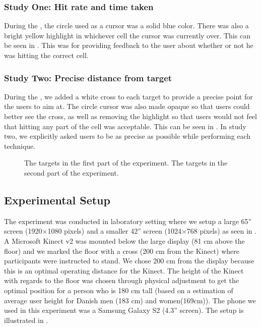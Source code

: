 \subsubsection{Study One: Hit rate and time taken} 
During the \target, the circle used as a cursor was a solid blue color. 
There was also a bright yellow highlight in whichever cell the cursor was currently over.
This can be seen in .
This was for providing feedback to the user about whether or not he was hitting the correct cell. 

\subsubsection{Study Two: Precise distance from target}
During the \accuracy, we added a white cross to each target to provide a precise point for the users to aim at.
The circle cursor was also made opaque so that users could better see the cross, as well as removing the highlight so that users would not feel that hitting any part of the cell was acceptable.
This can be seen in .
In study two, we explicitly asked users to be as precise as possible while performing each technique.

\begin{figure}[H]
\centering
{}
\hspace{0.05\columnwidth}
\caption{\protect{} The targets in the first part of the experiment. \protect{} The targets in the second part of the experiment.}
\end{figure}

\subsection{Experimental Setup} \label{sec:setup}
The experiment was conducted in laboratory setting where we setup a large 65'' screen (1920$\times$1080 pixels) and a smaller 42'' screen (1024$\times$768 pixels) as seen in .
A Microsoft Kinect v2 was mounted below the large display (81 cm above the floor) and we marked the floor with a cross (200 cm from the Kinect) where participants were instructed to stand.
We chose 200 cm from the display because this is an optimal operating distance for the Kinect.
The height of the Kinect with regards to the floor was chosen through physical adjustment to get the optimal position for a person who is 180 cm tall (based on a estimation of average user height for Danish men (183 cm) and women(169cm)).
The phone we used in this experiment was a Samsung Galaxy S2 (4.3'' screen).
The setup is illustrated in .

